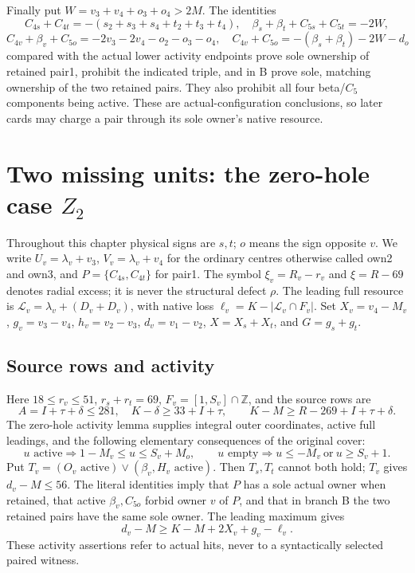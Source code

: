 \documentclass[11pt,letterpaper]{article}
\theoremstyle{definition}\newtheorem{definition}[theorem]{Definition}
\begin{document}
Finally put $W=v_3+v_4+o_3+o_4>2M$. The identities
\[
 C_{4s}+C_{4t}=-(s_2+s_3+s_4+t_2+t_3+t_4),\quad
 \beta_s+\beta_t+C_{5s}+C_{5t}=-2W,
\]
\[
 C_{4v}+\beta_v+C_{5o}=-2v_3-2v_4-o_2-o_3-o_4,\quad
 C_{4v}+C_{5o}=-(\beta_s+\beta_t)-2W-d_o
\]
compared with the actual lower activity endpoints prove sole ownership of retained pair1, prohibit the indicated triple, and in B prove sole, matching ownership of the two retained pairs. They also prohibit all four beta/$C_5$ components being active. These are actual-configuration conclusions, so later cards may charge a pair through its sole owner's native resource.


\section{Two missing units: the zero-hole case $Z_2$}\label{sec:Z2}
Throughout this chapter physical signs are $s,t$; $o$ means the sign opposite $v$.
We write $U_v=\lambda_v+v_3$, $V_v=\lambda_v+v_4$ for the ordinary centres otherwise called own2 and own3, and $P=\{C_{4s},C_{4t}\}$ for pair1. The symbol $\xi_v=R_v-r_v$ and $\xi=R-69$ denotes radial excess; it is never the structural defect $\rho$.
The leading full resource is $\mathcal L_v=\lambda_v+(D_v+D_v)$, with native loss $\ell_v=K-|\mathcal L_v\cap F_v|$.
Set $X_v=v_4-M_v$, $g_v=v_3-v_4$, $h_v=v_2-v_3$, $d_v=v_1-v_2$, $X=X_s+X_t$, and $G=g_s+g_t$.

\subsection{Source rows and activity}
Here $18\le r_v\le51$, $r_s+r_t=69$, $F_v=[1,S_v]\cap\mathbb Z$, and the source rows are
\begin{equation}\label{eq:z2-source}
 A=I+\tau+\delta\le281,\quad K-\delta\ge33+I+\tau,
 \qquad K-M\ge R-269+I+\tau+\delta .
\end{equation}
The zero-hole activity lemma supplies integral outer coordinates, active full leadings, and the following elementary consequences of the original cover:
\[
 u\text{ active}\Longrightarrow 1-M_v\le u\le S_v+M_o,
 \qquad u\text{ empty}\Longrightarrow u\le-M_v\ \text{or}\ u\ge S_v+1.
\]
Put $T_v=(O_v\text{ active})\lor(\beta_v,H_v\text{ active})$.
Then $T_s,T_t$ cannot both hold; $T_v$ gives $d_v-M\le56$.
The literal identities imply that $P$ has a sole actual owner when retained, that active $\beta_v,C_{5o}$ forbid owner $v$ of $P$, and that in branch B the two retained pairs have the same sole owner.
The leading maximum gives
\begin{equation}\label{eq:z2-lead}
 d_v-M\ge K-M+2X_v+g_v-\ell_v.
\end{equation}
These activity assertions refer to actual hits, never to a syntactically selected paired witness.
\end{document}
